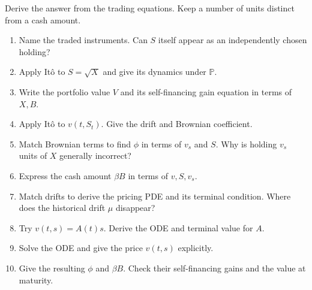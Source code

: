 \documentclass[10pt,letterpaper]{article}
\newcommand{\Pbb}{\mathbb{P}}
\newenvironment{drill}[1]{\begin{enumerate}[label=\textbf{#1.\arabic*},
 leftmargin=2.7em,labelsep=0.6em,itemsep=4pt,topsep=4pt,parsep=0pt]}{\end{enumerate}}
\begin{document}
Derive the answer from the trading equations. Keep a number of units distinct from a cash amount.
\begin{drill}{5}
\item Name the traded instruments. Can $S$ itself appear as an independently chosen holding?
\item Apply It\^o to $S=\sqrt X$ and give its dynamics under $\Pbb$.
\item Write the portfolio value $V$ and its self-financing gain equation in terms of $X,B$.
\item Apply It\^o to $v(t,S_t)$. Give the drift and Brownian coefficient.
\item Match Brownian terms to find $\phi$ in terms of $v_s$ and $S$.
Why is holding $v_s$ units of $X$ generally incorrect?
\item Express the cash amount $\beta B$ in terms of $v,S,v_s$.
\item Match drifts to derive the pricing PDE and its terminal condition.
Where does the historical drift $\mu$ disappear?
\item Try $v(t,s)=A(t)s$. Derive the ODE and terminal value for $A$.
\item Solve the ODE and give the price $v(t,s)$ explicitly.
\item Give the resulting $\phi$ and $\beta B$. Check their self-financing gains and
the value at maturity.
\end{drill}
\end{document}
